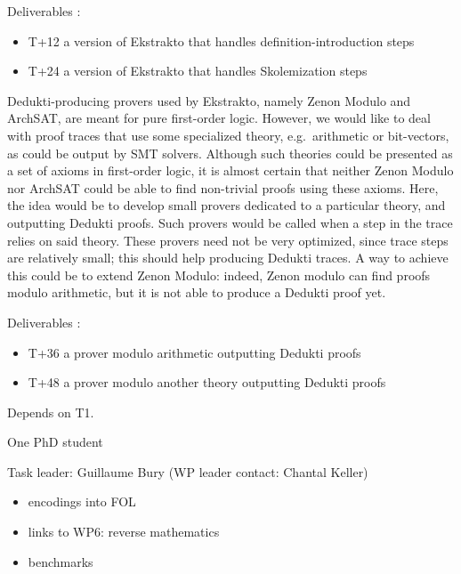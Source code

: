 \begin{workpackage}
\begin{tasklist}
\begin{task}[id=tracetodedukti, title=Translate ATP traces into Dedukti]
\begin{compactenum}
  Deliverables :
  \begin{itemize}
  \item T+12 a version of Ekstrakto that handles definition-introduction steps
  \item T+24 a version of Ekstrakto that handles Skolemization steps
  \end{itemize}



\item  Dedukti-producing provers used by Ekstrakto, namely Zenon Modulo and
  ArchSAT, are meant for pure first-order logic. However, we would like
  to deal with proof traces that use some specialized theory,
  e.g.\ arithmetic or bit-vectors, as could be output by SMT
  solvers. Although such theories could be presented as a set of axioms
  in first-order logic, it is almost certain that neither Zenon Modulo
  nor ArchSAT could be able to find non-trivial proofs using these
  axioms. Here, the idea would be to develop small provers dedicated to
  a particular theory, and outputting Dedukti proofs. Such provers would
  be called when a step in the trace relies on said theory. These
  provers need not be very optimized, since trace steps are relatively
  small; this should help producing Dedukti traces. A way to achieve
  this could be to extend Zenon Modulo: indeed, Zenon modulo can find
  proofs modulo arithmetic, but it is not able to produce a Dedukti
  proof yet.

  Deliverables :
  \begin{itemize}
  \item T+36 a prover modulo arithmetic outputting Dedukti proofs
  \item T+48 a prover modulo another theory outputting Dedukti proofs
  \end{itemize}

\end{compactenum}
  Depends on T1.

  One PhD student
  
\end{task}


\begin{task}[id=deduktitoatp, title=Translate Dedukti statements into ATPs inputs]
  Task leader: Guillaume Bury (WP leader contact: Chantal Keller)
  
\begin{itemize}
\item encodings into FOL
\item links to WP6: reverse mathematics
\item benchmarks
\end{itemize}


\end{task}
\end{tasklist}
\end{workpackage}
